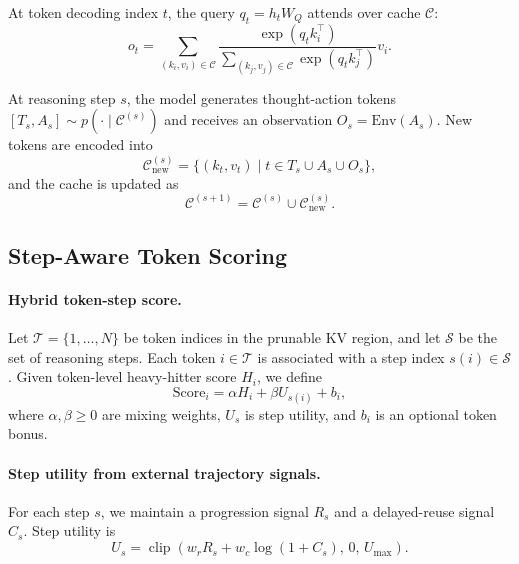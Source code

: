 \documentclass[11pt]{article}
\begin{document}
At token decoding index $t$, the query $q_t = h_t W_Q$ attends over cache $\mathcal{C}$:
\begin{equation}
o_t = \sum_{(k_i, v_i)\in\mathcal{C}}
\frac{\exp(q_t k_i^\top)}
{\sum_{(k_j, v_j)\in\mathcal{C}} \exp(q_t k_j^\top)}
v_i.
\end{equation}

At reasoning step $s$, the model generates thought-action tokens $[T_s, A_s] \sim p(\cdot \mid \mathcal{C}^{(s)})$ and receives an observation $O_s = \mathrm{Env}(A_s)$. New tokens are encoded into
\begin{equation}
\mathcal{C}_{\mathrm{new}}^{(s)}
=
\{(k_t, v_t) \mid t \in T_s \cup A_s \cup O_s\},
\end{equation}
and the cache is updated as
\begin{equation}
\mathcal{C}^{(s+1)} = \mathcal{C}^{(s)} \cup \mathcal{C}_{\mathrm{new}}^{(s)}.
\end{equation}

\subsection{Step-Aware Token Scoring}

\paragraph{Hybrid token-step score.}
Let $\mathcal{T} = \{1,\dots,N\}$ be token indices in the prunable KV region, and let $\mathcal{S}$ be the set of reasoning steps. Each token $i\in\mathcal{T}$ is associated with a step index $s(i)\in\mathcal{S}$. Given token-level heavy-hitter score $H_i$, we define
\begin{equation}
\label{eq:token-score}
\mathrm{Score}_i = \alpha H_i + \beta U_{s(i)} + b_i,
\end{equation}
where $\alpha,\beta\ge 0$ are mixing weights, $U_s$ is step utility, and $b_i$ is an optional token bonus.

\paragraph{Step utility from external trajectory signals.}
For each step $s$, we maintain a progression signal $R_s$ and a delayed-reuse signal $C_s$. Step utility is
\begin{equation}
\label{eq:step-utility}
U_s = \operatorname{clip}\!\left(w_r R_s + w_c \log(1+C_s),\, 0,\, U_{\max}\right).
\end{equation}
\end{document}
